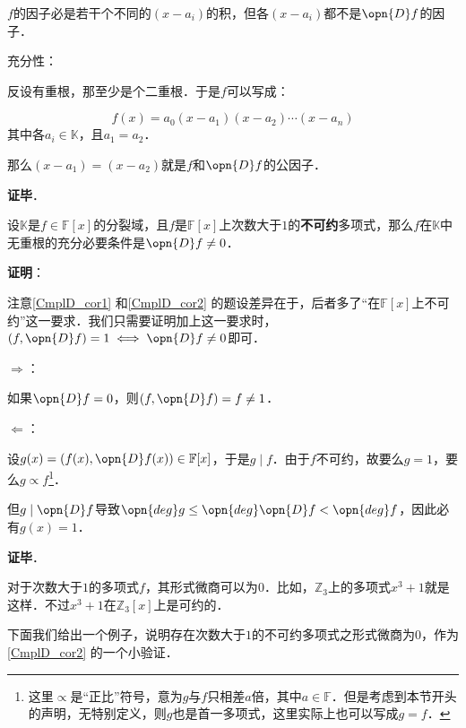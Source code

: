 $f$的因子必是若干个不同的$(x-a_i)$的积，但各$(x-a_i)$都不是$\opn{D}f$的因子．

充分性：

反设有重根，那至少是个二重根．于是$f$可以写成：

\begin{equation}
f(x) = a_0(x-a_1)(x-a_2)\cdots(x-a_n)
\end{equation}
其中各$a_i\in\mathbb{K}$，且$a_1=a_2$．

那么$(x-a_1)=(x-a_2)$就是$f$和$\opn{D}f$的公因子．

\textbf{证毕}．



\begin{corollary}{}\label{CmplD_cor2}
设$\mathbb{K}$是$f\in\mathbb{F}[x]$的分裂域，且$f$是$\mathbb{F}[x]$上次数大于$1$的\textbf{不可约}多项式，那么$f$在$\mathbb{K}$中无重根的充分必要条件是$\opn{D}f \neq 0$．
\end{corollary}

\textbf{证明}：

注意\autoref{CmplD_cor1} 和\autoref{CmplD_cor2} 的题设差异在于，后者多了“在$\mathbb{F}[x]$上不可约”这一要求．我们只需要证明加上这一要求时，$(f, \opn{D}f)=1 \iff \opn{D}f\neq 0$即可．

$\Rightarrow$：

如果$\opn{D}f=0$，则$(f, \opn{D}f)=f\neq 1$．

$\Leftarrow$：

设$g(x)=(f(x), \opn{D}f(x))\in\mathbb{F}[x]$，于是$g\mid f$．由于$f$不可约，故要么$g=1$，要么$g\propto f$\footnote{这里$\propto$是“正比”符号，意为$g$与$f$只相差$a$倍，其中$a\in\mathbb{F}$．但是考虑到本节开头的声明，无特别定义，则$g$也是首一多项式，这里实际上也可以写成$g=f$．}．

但$g\mid \opn{D}f$导致$\opn{deg}g\leq\opn{deg}\opn{D}f<\opn{deg}f$，因此必有$g(x)=1$．



\textbf{证毕}．

对于次数大于$1$的多项式$f$，其形式微商可以为$0$．比如，$\mathbb{Z}_3$上的多项式$x^3+1$就是这样．不过$x^3+1$在$\mathbb{Z}_3[x]$上是可约的．

下面我们给出一个例子，说明存在次数大于$1$的不可约多项式之形式微商为$0$，作为\autoref{CmplD_cor2} 的一个小验证．





